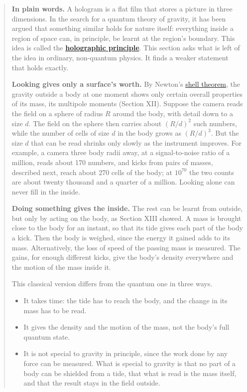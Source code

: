 \begin{quote}
\textbf{In plain words.} A hologram is a flat film that stores a picture in three
dimensions. In the search for a quantum theory of gravity, it has been argued
that something similar holds for nature itself: everything inside a region of
space can, in principle, be learnt at the region's boundary. This idea is
called the
\textbf{\href{https://en.wikipedia.org/wiki/Holographic_principle}{holographic
principle}}. This section asks what is left of the idea in ordinary,
non-quantum physics. It finds a weaker statement that holds exactly.

\textbf{Looking gives only a surface's worth.} By Newton's
\href{https://en.wikipedia.org/wiki/Shell_theorem}{shell theorem}, the gravity
outside a body at one moment shows only certain overall properties of its mass,
its multipole moments (Section XII). Suppose the camera reads the field on a
sphere of radius $R$ around the body, with detail down to a size $d$. The field
on the sphere then carries about $(R/d)^2$ such numbers, while the number of
cells of size $d$ in the body grows as $(R/d)^3$. But the size $d$ that can be
read shrinks only slowly as the instrument improves. For example, a camera three
body radii away, at a signal-to-noise ratio of a million, reads about 170
numbers, and kicks from pairs of masses, described next, reach about 270 cells of the body; at
$10^{70}$ the two counts are about twenty thousand and a quarter of a million.
Looking alone can never fill in the inside.

\textbf{Doing something gives the inside.} The rest can be learnt from outside,
but only by acting on the body, as Section XIII showed. A mass is brought close
to the body for an instant, so that its tide gives each part of the body a
kick. Then the body is weighed, since the energy it gained adds to its mass.
Alternatively, the loss of speed of the passing mass is measured. The gains,
for enough different kicks, give the body's density everywhere and the motion
of the mass inside it.

This classical version differs from the quantum one in three ways.
\begin{itemize}
\item It takes time: the tide has to reach the body, and the change in its mass
has to be read.
\item It gives the density and the motion of the mass, not the body's full
quantum state.
\item It is not special to gravity in principle, since the work done by any
force can be measured. What is special to gravity is that no part of a body
can be shielded from a tide, that what is read is the mass itself, and that
the result stays in the field outside.
\end{itemize}


\end{quote}

